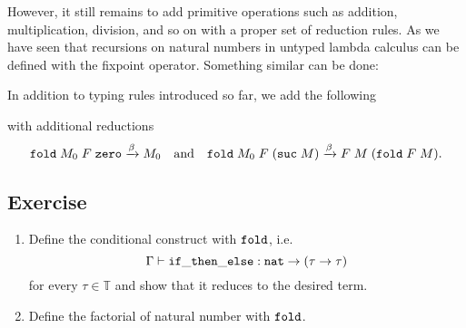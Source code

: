 However, it still remains to add primitive operations such as addition,
multiplication, division, and so on with a proper set of reduction rules. As we
have seen that recursions on natural numbers in untyped lambda calculus can be
defined with the fixpoint operator. Something similar can be done:
\begin{definition}
  In addition to typing rules introduced so far, we add the following
  \begin{prooftree}
  \end{prooftree}
  with additional reductions
  \[
    \fold\;M_0\;F\;\zero
    \xrightarrow{\beta}
    M_0
    \quad\text{and}\quad
    \fold\;M_0\;F\;(\suc\;M)
    \xrightarrow{\beta}
    F\;M\;(\fold\;F\;M).
  \]
\end{definition}
\begin{definition}
\end{definition}
\subsection*{Exercise}
\begin{enumerate}
  \item Define the conditional construct with $\fold$, i.e.\
    \[
      \Gamma \vdash \mathtt{if\_then\_else} : \nat \to (\tau \to \tau)
    \]
    for every $\tau \in \mathbb{T}$ and show that it reduces to the desired
    term.
  \item Define the factorial of natural number with $\fold$.
\end{enumerate}


 


